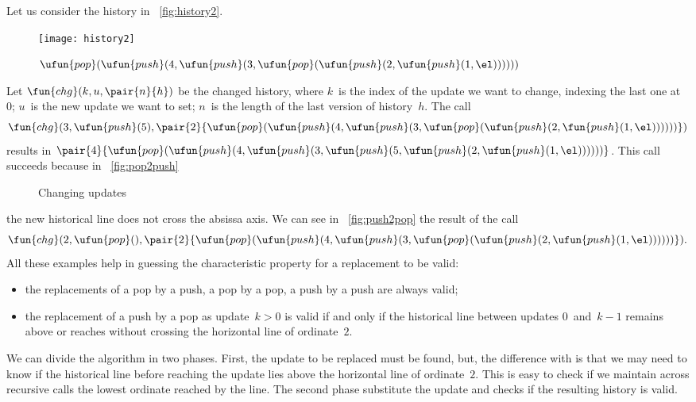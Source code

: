 Let us consider the history in \fig~\vref{fig:history2}.
\begin{figure}
\centering
\texttt{[image: history2]}%
\caption{$\ufun{pop}(\ufun{push}(4,\ufun{push}(3,
          \ufun{pop}(\ufun{push}(2,\ufun{push}(1,\el))))))$}
\label{fig:history2}
\end{figure}
Let \(\fun{chg}(k,u,\pair{n}{h})\) be the
changed history, where \(k\)~is the index of the update we want to
change, indexing the last one at~\(0\); \(u\)~is the new update we
want to set; \(n\)~is the length of the last version of
history~\(h\). The call
\begin{equation*}
\fun{chg}(3,\ufun{push}(5),
  \pair{2}{\ufun{pop}(\ufun{push}(4,\ufun{push}(3,
           \ufun{pop}(\ufun{push}(2,\fun{push}(1,\el))))))})
\end{equation*}
results in
\(\pair{4}{\ufun{pop}(\ufun{push}(4,\ufun{push}(3,\ufun{push}(5,
  \ufun{push}(2,\ufun{push}(1,\el))))))}\). \!\!This call succeeds
because in \fig~\ref{fig:pop2push}
\begin{figure}
\centering
{}
\quad
{}
\caption{Changing updates}
\end{figure}
the new historical line does not cross the absissa axis. We can see in
\fig~\ref{fig:push2pop} the result of the call
\begin{equation*}
\fun{chg}(2,\ufun{pop}(),
            \pair{2}{\ufun{pop}(\ufun{push}(4,\ufun{push}(3,
                     \ufun{pop}(\ufun{push}(2,\ufun{push}(1,\el))))))}).
\end{equation*}
All these examples help in guessing the characteristic property for a
replacement to be valid:
\begin{itemize}

  \item the replacements of a pop by a push, a pop by a pop, a push by
    a push are always valid;

  \item the replacement of a push by a pop as update~\(k>0\) is valid
    if and only if the historical line between updates
    \(0\)~and~\(k-1\) remains above or reaches without crossing the
    horizontal line of ordinate~\(2\).

\end{itemize}
We can divide the algorithm in two phases. First, the update to be
replaced must be found, but, the difference with  is
that we may need to know if the historical line before reaching the
update lies above the horizontal line of ordinate~\(2\). This is easy
to check if we maintain across recursive calls the lowest ordinate
reached by the line. The second phase substitute the update and checks
if the resulting history is valid.

